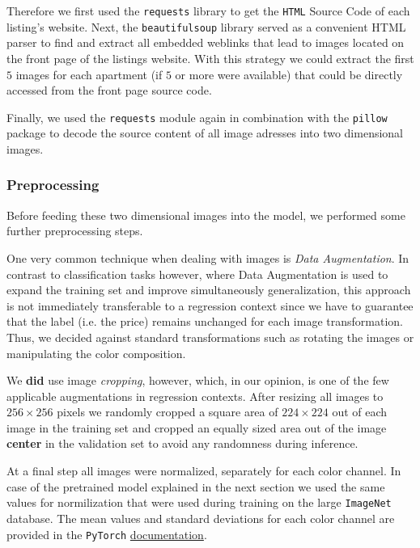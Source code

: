 \documentclass[12pt, letterpaper]{article}
\begin{document}
Therefore we first used the \texttt{requests} library to get the \texttt{HTML} Source Code of each listing's website.
Next, the \texttt{beautifulsoup} library served as a convenient HTML parser to find and extract all embedded weblinks that lead to images located on the front page of the listings website.
With this strategy we could extract the first $5$ images for each apartment (if $5$ or more were available) that could be directly accessed from the front page source code.

Finally, we used the \texttt{requests} module again in combination with the \texttt{pillow} package to decode the source content of all image adresses into two dimensional images.


\subsubsection{Preprocessing}

Before feeding these two dimensional images into the model, we performed some further preprocessing steps.

One very common technique when dealing with images is \emph{Data Augmentation}.
In contrast to classification tasks however, where Data Augmentation is used to expand the training set and improve simultaneously generalization, this approach is not immediately transferable to a regression context since we have to guarantee that the label (i.e. the price) remains unchanged for each image transformation.
Thus, we decided against standard transformations such as rotating the images or manipulating the color composition.

We \textbf{did} use image \emph{cropping}, however, which, in our opinion, is one of the few applicable augmentations in regression contexts.
After resizing all images to $256 \times 256$ pixels we randomly cropped a square area of $224 \times 224$ out of each image in the training set and cropped an equally sized area out of the image \textbf{center} in the validation set to avoid any randomness during inference.

At a final step all images were normalized, separately for each color channel.
In case of the pretrained model explained in the next section we used the same values for normilization that were used during training on the large \texttt{ImageNet} database.
The mean values and standard deviations for each color channel are provided in the \texttt{PyTorch} \href{https://pytorch.org/vision/stable/models.html}{documentation}.
\end{document}
